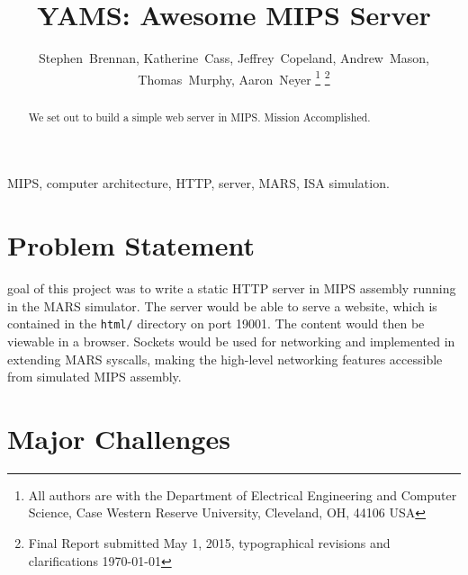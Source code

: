 \documentclass[journal,10pt]{IEEEtran}
\begin{document}
\title{YAMS: Awesome MIPS Server}

\author{
Stephen~Brennan,
Katherine~Cass,
Jeffrey~Copeland,
Andrew~Mason,
Thomas~Murphy,
Aaron~Neyer%
\thanks{All authors are with the Department of Electrical Engineering and Computer Science, Case Western Reserve University, Cleveland, OH, 44106 USA}%
\thanks{Final Report submitted May 1, 2015, typographical revisions and clarifications \today}
} %


%
{}

\maketitle

\begin{abstract}
We set out to build a simple web server in MIPS. Mission Accomplished.
\end{abstract}

\begin{IEEEkeywords}
MIPS, computer architecture, HTTP, server, MARS, ISA simulation.
\end{IEEEkeywords}


\section{Problem Statement}

 goal of this project was to write a static HTTP server in
MIPS assembly running in the MARS simulator. The server would be able to serve a
website, which is contained in the \texttt{html/} directory on port 19001. The
content would then be viewable in a browser. Sockets would be used for
networking and implemented in extending MARS syscalls, making the high-level
networking features accessible from simulated MIPS assembly.


\section{Major Challenges}
\end{document}
